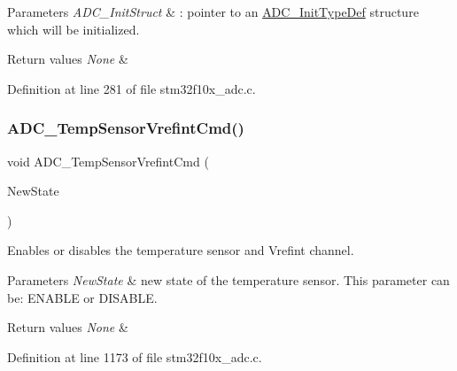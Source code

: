 \begin{DoxyParams}{Parameters}
{\em A\+D\+C\+\_\+\+Init\+Struct} & \+: pointer to an \hyperlink{struct_a_d_c___init_type_def}{A\+D\+C\+\_\+\+Init\+Type\+Def} structure which will be initialized. \\
\hline
\end{DoxyParams}

\begin{DoxyRetVals}{Return values}
{\em None} & \\
\hline
\end{DoxyRetVals}


Definition at line 281 of file stm32f10x\+\_\+adc.\+c.

\mbox{\label{group___a_d_c___exported___functions_ga848682e2d7d3de9f8cf03ffa4c11f0b5}} 
\subsubsection{\texorpdfstring{A\+D\+C\+\_\+\+Temp\+Sensor\+Vrefint\+Cmd()}{ADC\_TempSensorVrefintCmd()}}
{\footnotesize\ttfamily void A\+D\+C\+\_\+\+Temp\+Sensor\+Vrefint\+Cmd (\begin{DoxyParamCaption}\item[{\hyperlink{group___exported__types_gac9a7e9a35d2513ec15c3b537aaa4fba1}{Functional\+State}}]{New\+State }\end{DoxyParamCaption})}



Enables or disables the temperature sensor and Vrefint channel. 


\begin{DoxyParams}{Parameters}
{\em New\+State} & new state of the temperature sensor. This parameter can be\+: E\+N\+A\+B\+LE or D\+I\+S\+A\+B\+LE. \\
\hline
\end{DoxyParams}

\begin{DoxyRetVals}{Return values}
{\em None} & \\
\hline
\end{DoxyRetVals}


Definition at line 1173 of file stm32f10x\+\_\+adc.\+c.

